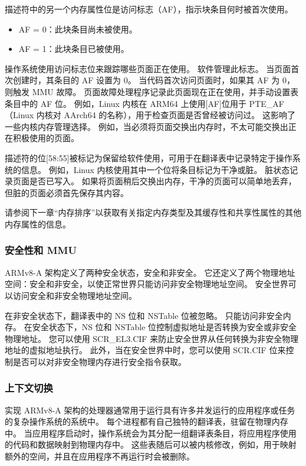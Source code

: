 描述符中的另一个内存属性位是访问标志（AF），指示块条目何时被首次使用。

\begin{itemize}
  \item AF = 0：此块条目尚未被使用。
  \item AF = 1：此块条目已被使用。
\end{itemize}

操作系统使用访问标志位来跟踪哪些页面正在使用。
软件管理此标志。
当页面首次创建时，其条目的 AF 设置为 0。
当代码首次访问页面时，如果其 AF 为 0，则触发 MMU 故障。
页面故障处理程序记录此页面现在正在使用，并手动设置表条目中的 AF 位。
例如，Linux 内核在 ARM64 上使用{[}AF{]}位用于 PTE\_AF（Linux 内核对 AArch64 的名称），用于检查页面是否曾经被访问过。
这影响了一些内核内存管理选择。
例如，当必须将页面交换出内存时，不太可能交换出正在积极使用的页面。

描述符的位{[}58:55{]}被标记为保留给软件使用，可用于在翻译表中记录特定于操作系统的信息。
例如，Linux 内核使用其中一个位将条目标记为干净或脏。
脏状态记录页面是否已写入。
如果将页面稍后交换出内存，干净的页面可以简单地丢弃，但脏的页面必须首先保存其内容。


请参阅下一章“内存排序”以获取有关指定内存类型及其缓存性和共享性属性的其他内存属性的信息。

\subsubsection{安全性和 MMU}

ARMv8-A 架构定义了两种安全状态，安全和非安全。
它还定义了两个物理地址空间：安全和非安全，以使正常世界只能访问非安全物理地址空间。
安全世界可以访问安全和非安全物理地址空间。

在非安全状态下，翻译表中的 NS 位和 NSTable 位被忽略。
只能访问非安全内存。
在安全状态下，NS 位和 NSTable 位控制虚拟地址是否转换为安全或非安全物理地址。
您可以使用 SCR\_EL3.CIF 来防止安全世界从任何转换为非安全物理地址的虚拟地址执行。
此外，当在安全世界中时，您可以使用 SCR.CIF 位来控制是否可以对非安全物理内存进行安全指令获取。

\subsubsection{上下文切换}

实现 ARMv8-A 架构的处理器通常用于运行具有许多并发运行的应用程序或任务的复杂操作系统的系统中。
每个进程都有自己独特的翻译表，驻留在物理内存中。
当应用程序启动时，操作系统会为其分配一组翻译表条目，将应用程序使用的代码和数据映射到物理内存中。
这些表随后可以被内核修改，例如，用于映射额外的空间，并且在应用程序不再运行时会被删除。


